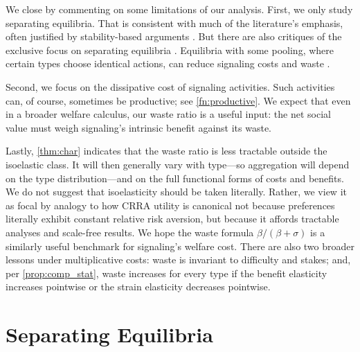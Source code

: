 \documentclass[12 pt]{article}
\theoremstyle{remark}
\theoremstyle{definition}
\begin{document}
We close by commenting on some limitations of our analysis. First, we only study separating equilibria. That is consistent with much of the literature's emphasis, often justified by stability-based arguments \citep[e.g.,][]{ChoSobel90}. But there are also critiques of the exclusive focus on separating equilibria \citep[e.g.,][]{MOFP93}. Equilibria with some pooling, where certain types choose identical actions, can reduce signaling costs and waste \citep[e.g.,][]{krishna2026pareto}.


Second, we focus on the dissipative cost of signaling activities. Such activities can, of course, sometimes be productive; see \autoref{fn:productive}. We expect that even in a broader welfare calculus, our waste ratio is a useful input: the net social value must weigh signaling's intrinsic benefit against its waste.


Lastly, \autoref{thm:char} indicates that the waste ratio is less tractable outside the isoelastic class. It will then generally vary with type---so aggregation will depend on the type distribution---and on the full functional forms of costs and benefits. We do not suggest that isoelasticity should be taken literally. Rather, we view it as focal by analogy to how CRRA utility is canonical not because preferences literally exhibit constant relative risk aversion, but because it affords tractable analyses and scale-free results. We hope the waste formula $\beta/(\beta + \sigma)$ is a similarly useful benchmark for signaling's welfare cost. %
There are also two broader lessons under multiplicative costs: 
waste is invariant to difficulty and stakes; and, per \autoref{prop:comp_stat}, waste increases for every type if the benefit elasticity increases pointwise or the strain elasticity decreases pointwise.

\appendix

\section{Separating Equilibria}
\label{sec:separating}
\end{document}
